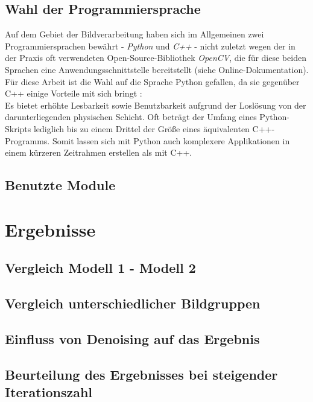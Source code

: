 		\subsection{Wahl der Programmiersprache}
		\label{sub:prog-lang}
			Auf dem Gebiet der Bildverarbeitung haben sich im Allgemeinen zwei Programmiersprachen bewährt - \textit{Python} und \textit{C++} - nicht zuletzt wegen der in der Praxis oft verwendeten Open-Source-Bibliothek \textit{OpenCV}, die für diese beiden Sprachen eine Anwendungsschnittstelle bereitstellt (siehe Online-Dokumentation). Für diese Arbeit ist die Wahl auf die Sprache Python gefallen, da sie gegenüber C++ einige Vorteile mit sich bringt \cite[S. 21f]{python-book}:\\
			Es bietet erhöhte Lesbarkeit sowie Benutzbarkeit aufgrund der Loslösung von der darunterliegenden physischen Schicht. Oft beträgt der Umfang eines Python-Skripts lediglich bis zu einem Drittel der Größe eines äquivalenten C++-Programms. Somit lassen sich mit Python auch komplexere Applikationen in einem kürzeren Zeitrahmen erstellen als mit C++.

		\subsection{Benutzte Module}
		\label{sub:used-modules}
		
	\section{Ergebnisse}
	\label{sec:results}
	
		\subsection{Vergleich Modell 1 - Modell 2}
		\label{sub:comp-m1-m2}
		
		\subsection{Vergleich unterschiedlicher Bildgruppen}
		\label{sub:comp-diff-images}
		
		\subsection{Einfluss von Denoising auf das Ergebnis}
		\label{sub:influence-of-denoising}
		
		\subsection{Beurteilung des Ergebnisses bei steigender Iterationszahl}
		\label{sub:judging-higher-iteration}